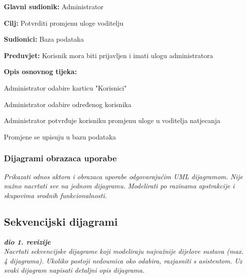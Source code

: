 					\noindent {}
					\begin{packed_item}
						
						\item \textbf{Glavni sudionik: }Administrator
						\item  \textbf{Cilj:} Potvrditi promjenu uloge voditelju
						\item  \textbf{Sudionici:} Baza podataka
						\item  \textbf{Preduvjet:} Korisnik mora biti prijavljen i imati ulogu administratora
						\item  \textbf{Opis osnovnog tijeka:}
						
						\item[] \begin{packed_enum}
							
							\item Administrator odabire karticu "Korisnici"
							\item Administrator odabire određenog korisnika
							\item Administrator potvrđuje korisniku promjenu uloge u voditelja natjecanja
							\item Promjene se upisuju u bazu podataka
						\end{packed_enum}
					\end{packed_item}
					
				\subsubsection{Dijagrami obrazaca uporabe}
					
					\textit{Prikazati odnos aktora i obrazaca uporabe odgovarajućim UML dijagramom. Nije nužno nacrtati sve na jednom dijagramu. Modelirati po razinama apstrakcije i skupovima srodnih funkcionalnosti.}
				\eject		
				
			\subsection{Sekvencijski dijagrami}
				
				\textbf{\textit{dio 1. revizije}}\\
				
				\textit{Nacrtati sekvencijske dijagrame koji modeliraju najvažnije dijelove sustava (max. 4 dijagrama). Ukoliko postoji nedoumica oko odabira, razjasniti s asistentom. Uz svaki dijagram napisati detaljni opis dijagrama.}
				\eject
	
